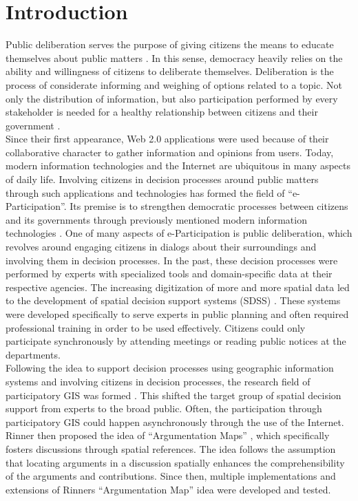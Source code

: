 \section{Introduction}
\label{chap:introduction}
Public deliberation serves the purpose of giving citizens the means to educate themselves about public matters \cite{page1996deliberates}. In this sense, democracy heavily relies on the ability and willingness of citizens to deliberate themselves. Deliberation is the process of considerate informing and weighing of options related to a topic. Not only the distribution of information, but also participation performed by every stakeholder is needed for a healthy relationship between citizens and their government \cite{Arnstein1969_citizen_participation}.\\
Since their first appearance, Web 2.0 applications were used because of their collaborative character to gather information and opinions from users. Today, modern information technologies and the Internet are ubiquitous in many aspects of daily life. Involving citizens in decision processes around public matters through such applications and technologies has formed the field of ``e-Participation''. Its premise is to strengthen democratic processes between citizens and its governments through previously mentioned modern information technologies \cite{Saebo_eParticipation, Medaglia2012_eParticipation}. One of many aspects of e-Participation is public deliberation, which revolves around engaging citizens in dialogs about their surroundings and involving them in decision processes. In the past, these decision processes were performed by experts with specialized tools and domain-specific data at their respective agencies. The increasing digitization of more and more spatial data led to the development of spatial decision support systems (SDSS) \cite{densham_sdss}. These systems were developed specifically to serve experts in public planning and often required professional training in order to be used effectively. Citizens could only participate synchronously by attending meetings or reading public notices at the departments.\\
Following the idea to support decision processes using geographic information systems and involving citizens in decision processes, the research field of participatory GIS was formed \cite{Macintosh2004_eParticipation_characterization,Sieber2006_PublicParticipationGIS}. This shifted the target group of spatial decision support from experts to the broad public. Often, the participation through participatory GIS could happen asynchronously through the use of the Internet. Rinner then proposed the idea of ``Argumentation Maps'' \cite{Rinner_ArgumentationMaps}, which specifically fosters discussions through spatial references. The idea follows the assumption that locating arguments in a discussion spatially enhances the comprehensibility of the arguments and contributions. Since then, multiple implementations and extensions of Rinners ``Argumentation Map'' idea were developed and tested.\\
